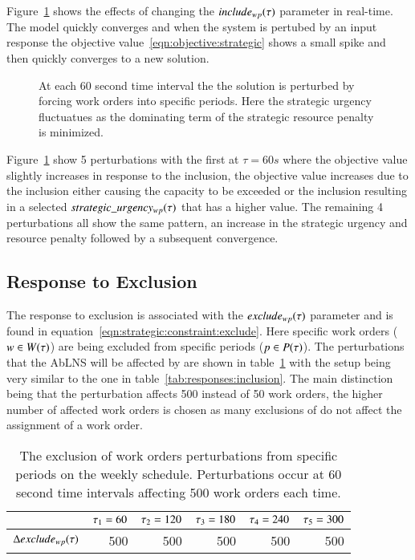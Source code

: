 Figure~\ref{fig:responses:inclusion} shows the effects of changing the $
include_{wp}(\tau)$ parameter in real-time. The model quickly converges
and when the system is pertubed by an input response the objective 
value~\ref{eqn:objective:strategic} shows a small spike and then quickly converges to
a new solution.

\begin{figure}[H]
	\centering
	\resizebox{10cm}{!}{
		
	}
	\caption{At each 60 second time interval the the solution is perturbed by forcing work orders into specific
		periods. Here the strategic urgency fluctuatues as the dominating term of the strategic resource penalty
		is minimized.
	}\label{fig:responses:inclusion}
\end{figure}
Figure~\ref{fig:responses:inclusion}  show 5 perturbations with the first
at $\tau = 60s$ where the objective value slightly increases in response to
the inclusion, the objective value increases due to the inclusion either
causing the capacity to be exceeded or the inclusion resulting in a selected
$ strategic\_urgency_{w p}(\tau)$ that has a higher value. The remaining 4 perturbations
all show the same  pattern, an increase in the strategic urgency and
resource penalty  followed by a subsequent convergence.

\subsection{Response to Exclusion}\label{sec:exclusion}
The response to exclusion is associated with the $exclude_{wp}(\tau)$
parameter and is found in equation~\ref{eqn:strategic:constraint:exclude}.
Here specific work orders ($w \in W(\tau)$) are
being excluded from specific periods ($p \in P(\tau)$).
The perturbations that the AbLNS will be affected by are shown in
table~\ref{tab:responses:exclusion}
with the setup being very similar to the
one in table~\ref{tab:responses:inclusion}.
The main distinction being that the perturbation affects 500 instead of 50 work orders, the higher number 
of affected work orders is chosen as many exclusions of do not affect the assignment of a work order.

\begin{table}[H]
	\centering
	\begin{tabular}{lrrrrr}
	\toprule
	                                & $\tau_1 = 60$ & $\tau_2 = 120$ & $\tau_3 = 180$ & $\tau_4 = 240$ & $\tau_5 = 300$ \\ \midrule
	$\Delta exclude_{wp}(\tau)$ & 500                   & 500                    & 500                    & 500                    & 500                    \\ \bottomrule
	\end{tabular}
	\caption{The exclusion of work orders perturbations from specific periods on the weekly schedule. 
		Perturbations occur at 60 second time intervals affecting 500 work orders each time.
	}\label{tab:responses:exclusion}
\end{table}

